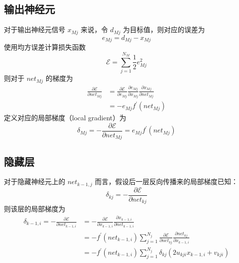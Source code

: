     \subsection{输出神经元}
        对于输出神经元信号 $x_{Mj}$ 来说，令 $d_{Mj}$ 为目标值，则对应的误差为
        \begin{equation*}
            e_{Mj} = d_{Mj} - x_{Mj}
        \end{equation*}
        使用均方误差计算损失函数
        \begin{equation}\label{eq:loss}
            \mathcal{E} = \sum_{j=1}^{N_{M}}\frac{1}{2}e_{Mj}^2
        \end{equation}
        则对于 $\mathit{net}_{Mj}$ 的梯度为
        \begin{align*}
            \frac{\partial\mathcal{E}}{\partial net_{Mj}} &= \frac{\partial\mathcal{E}}{\partial e_{Mj}}\frac{\partial e_{Mj}}{\partial x_{Mj}}\frac{\partial x_{Mj}}{\partial \mathit{net}_{Mj}} \\
            &= -e_{Mj}f^\prime(\mathit{net}_{Mj})
        \end{align*}
        定义对应的局部梯度（local gradient）为
        \begin{equation}
            \delta_{Mj} = -\frac{\partial\mathcal{E}}{\partial net_{Mj}} = e_{Mj}f^\prime(\mathit{net}_{Mj})
        \end{equation}
    \subsection{隐藏层}
    对于隐藏神经元上的 $net_{k-1,j}$ 而言，假设后一层反向传播来的局部梯度已知：
    \begin{equation*}
        \delta_{kj} = -\frac{\partial\mathcal{E}}{\partial\mathit{net}_{kj}}
    \end{equation*}
    则该层的局部梯度为
    \begin{align}
        \delta_{k-1,i} = -\frac{\partial\mathcal{E}}{\partial\mathit{net}_{k-1,i}} &= -\frac{\partial\mathcal{E}}{\partial x_{k-1,i}}\frac{\partial x_{k-1,i}}{\partial\mathit{net}_{k-1,i}} \nonumber\\
        &= -f^\prime(\mathit{net}_{k-1,i})\sum_{j=1}^{N_j}\frac{\partial\mathcal{E}}{\partial\mathit{net}_{kj}}\frac{\partial\mathit{net}_{kj}}{\partial x_{k-1,i}} \nonumber\\
        &= -f^\prime(\mathit{net}_{k-1,i})\sum_{j=1}^{N_j}\delta_{kj}(2u_{kji}x_{k-1,i}+v_{kji})
    \end{align}
